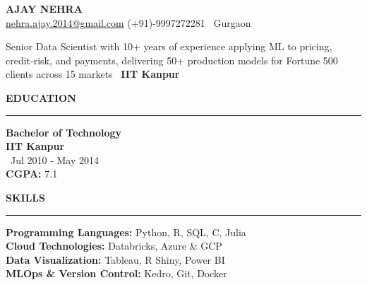 \documentclass[a4paper,10pt]{article}
\begin{document}
\begin{center}
    \textbf{\LARGE \MakeUppercase{Ajay Nehra}} \\
    \vspace{1mm}
    \href{mailto:nehra.ajay.2014@gmail.com}{nehra.ajay.2014@gmail.com} \hspace{5mm}
    \href{https://www.linkedin.com/in/ajay-n-575bba23/}{\faLinkedin} \hspace{5mm}
    (+91)-9997272281 \hspace{5mm}
    \faMapMarker \, Gurgaon

\end{center}

\vspace{1mm}

{\large
Senior Data Scientist with 10+ years of experience applying ML to pricing, credit‑risk, and payments, delivering 50+ production models for Fortune 500 clients across 15 markets \textbar\ \textbf{IIT Kanpur}
}

\vspace{1mm}

\begin{multicols}{2}

\textbf{\LARGE \MakeUppercase{Education}} \\
\rule{\columnwidth}{0.8pt}
\textbf{Bachelor of Technology} \\
\textbf{IIT Kanpur} \\
\faCalendar \, Jul 2010 - May 2014 \\
\textbf{CGPA:} 7.1

\columnbreak

\textbf{\LARGE \MakeUppercase{Skills}} \\
\rule{\columnwidth}{0.8pt}
\textbf{Programming Languages:} Python, R, SQL, C, Julia\\
\textbf{Cloud Technologies:} Databricks, Azure \& GCP\\
\textbf{Data Visualization:} Tableau, R Shiny, Power BI \\
\textbf{MLOps \& Version Control:} Kedro, Git, Docker

\end{multicols}
\end{document}
